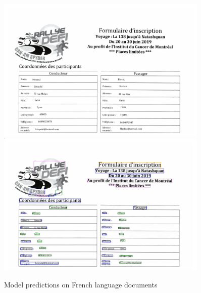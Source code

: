 \begin{figure}[!ht]
\centering
\includegraphics[width=0.9\textwidth]{chapters/images/experiments_and_results/original/fr_train_9.jpg}\hfill
\includegraphics[width=0.9\textwidth]{chapters/images/experiments_and_results/results/fr_train_9.jpg}
% 
\caption{Model predictions on French language documents}
    \label{fig:result_lang_fr}
\end{figure}

